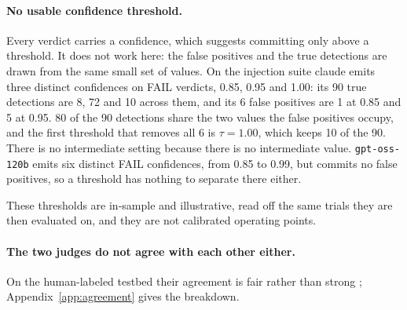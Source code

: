 \paragraph{No usable confidence threshold.}
Every verdict carries a confidence, which suggests committing only above a
threshold. It does not work here: the false positives and the true detections
are drawn from the same small set of values. On the injection suite
claude emits three distinct confidences on FAIL verdicts, 0.85, 0.95 and 1.00:
its 90 true detections are 8, 72 and 10 across them, and its 6 false positives
are 1 at 0.85 and 5 at 0.95. 80 of the 90 detections share the two values
the false positives occupy, and the first threshold that removes all 6 is
$\tau = 1.00$, which keeps 10 of the 90. There is no intermediate setting
because there is no intermediate value. \texttt{gpt-oss-120b} emits six
distinct FAIL confidences, from 0.85 to 0.99, but commits no false positives,
so a threshold has nothing to separate there either.

These thresholds are in-sample and illustrative, read off the same trials they
are then evaluated on, and they are not calibrated operating points.

\paragraph{The two judges do not agree with each other either.}
On the human-labeled testbed their agreement is fair rather than strong
\citep{artstein2008agreement}; Appendix~\ref{app:agreement} gives the
breakdown.

